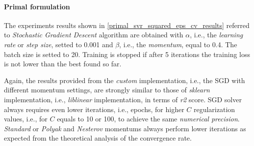 \paragraph{Primal formulation}

The experiments results shown in \ref{primal_svr_squared_eps_cv_results} referred to \emph{Stochastic Gradient Descent} algorithm are obtained with $\alpha$, i.e., the \emph{learning rate} or \emph{step size}, setted to 0.001 and $\beta$, i.e., the \emph{momentum}, equal to 0.4. The batch size is setted to 20. Training is stopped if after 5 iterations the training loss is not lower than the best found so far.



Again, the results provided from the \emph{custom} implementation, i.e., the SGD with different momentum settings, are strongly similar to those of \emph{sklearn} implementation, i.e., \emph{liblinear} \cite{fan2008liblinear} implementation, in terms of \emph{r2} score. SGD solver always requires even lower iterations, i.e., epochs, for higher $C$ regularization values, i.e., for $C$ equals to 10 or 100, to achieve the same \emph{numerical precision}. \emph{Standard} or \emph{Polyak} and \emph{Nesterov} momentums always perform lower iterations as expected from the theoretical analysis of the convergence rate.